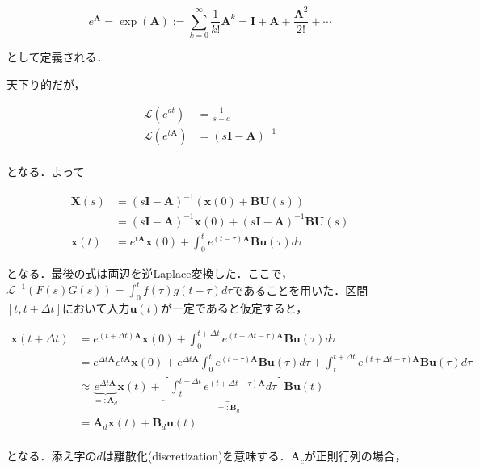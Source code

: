 \begin{equation}
e^\mathbf{A} = \exp(\mathbf{A}) := \sum_{k=0}^\infty \frac{1}{k!}\mathbf{A}^k = \mathbf{I}+\mathbf{A}+\frac{\mathbf{A}^2}{2!}+\cdots
\end{equation}


として定義される．

天下り的だが，


\begin{align}
\mathcal{L}(e^{at})&=\frac{1}{s-a}\\
\mathcal{L}(e^{t\mathbf{A}})&=(s\mathbf{I} - \mathbf{A})^{-1}\\
\end{align}


となる．よって


\begin{align}
\boldsymbol{X}(s) &= (s\mathbf{I} - \mathbf{A})^{-1}(\mathbf{x}(0) + \mathbf{B}\boldsymbol{U}(s))\\
&= (s\mathbf{I} - \mathbf{A})^{-1}\mathbf{x}(0) + (s\mathbf{I} - \mathbf{A})^{-1}\mathbf{B}\boldsymbol{U}(s)\\
\mathbf{x}(t)&=e^{t\mathbf{A}}\mathbf{x}(0)+\int_0^t e^{(t-\tau)\mathbf{A}}\mathbf{B}\mathbf{u}(\tau) d\tau
\end{align}


となる．最後の式は両辺を逆Laplace変換した．ここで，$\mathcal{L}^{-1}(F(s)G(s))=\int_0^tf(\tau)g(t-\tau)d\tau$であることを用いた．区間$[t, t+\Delta t]$において入力$\mathbf{u}(t)$が一定であると仮定すると，


\begin{align}
\mathbf{x}(t+\Delta t)&=e^{(t+\Delta t)\mathbf{A}}\mathbf{x}(0)+\int_0^{t+\Delta t} e^{(t+\Delta t-\tau)\mathbf{A}}\mathbf{B}\mathbf{u}(\tau) d\tau\\
&=e^{\Delta t\mathbf{A}}e^{t\mathbf{A}}\mathbf{x}(0)+e^{\Delta t\mathbf{A}}\int_0^{t} e^{(t-\tau)\mathbf{A}}\mathbf{B}\mathbf{u}(\tau) d\tau + \int_t^{t+\Delta t} e^{(t+\Delta t-\tau)\mathbf{A}}\mathbf{B}\mathbf{u}(\tau) d\tau\\
&\approx \underbrace{e^{\Delta t\mathbf{A}}}_{=: \mathbf{A}_d}\mathbf{x}(t)+\underbrace{\left[\int_t^{t+\Delta t} e^{(t+\Delta t-\tau)\mathbf{A}} d\tau\right] \mathbf{B}}_{=: \mathbf{B}_d}\mathbf{u}(t)\\
&=\mathbf{A}_d\mathbf{x}(t)+\mathbf{B}_d\mathbf{u}(t)\\
\end{align}


となる．添え字の$d$は離散化(discretization)を意味する．$\mathbf{A}_c$が正則行列の場合，


